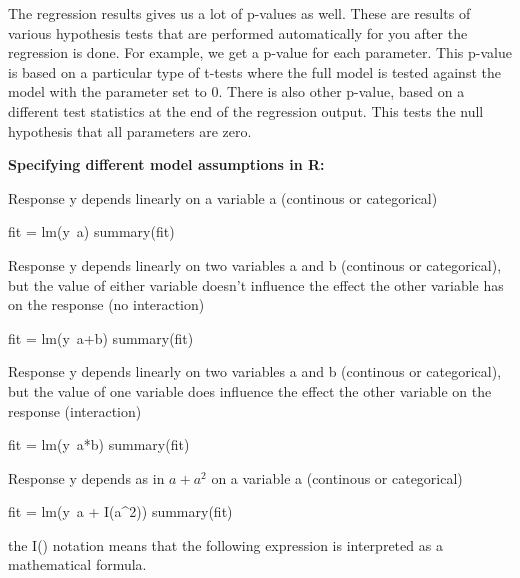 \documentclass[a4paper,twoside]{tufte-book}\usepackage[]{graphicx}\usepackage[]{color}
\begin{document}
The regression results gives us a lot of p-values as well. These are results of various hypothesis tests that are performed automatically for you after the regression is done. For example, we get a p-value for each parameter. This p-value is based on a particular type of t-tests where the full model is tested against the model with the parameter set to 0. There is also other p-value, based on a different test statistics at the end of the regression output. This tests the null hypothesis that all parameters are zero.  


\vspace{1cm}
\begin{fullwidth}
\begin{mdframed}
    
\textbf{Specifying different model assumptions in R:} 

Response y depends linearly on a variable a (continous or categorical)

\begin{Schunk}
\begin{Sinput}
fit = lm(y~a)
summary(fit)
\end{Sinput}
\end{Schunk}

Response y depends linearly on two variables a and b (continous or categorical), but the value of either variable doesn't influence the effect the other variable has on the response (no interaction)

\begin{Schunk}
\begin{Sinput}
fit = lm(y~a+b)
summary(fit)
\end{Sinput}
\end{Schunk}

Response y depends linearly on two variables a and b (continous or categorical), but the value of one variable does influence the effect the other variable on the response (interaction)

\begin{Schunk}
\begin{Sinput}
fit = lm(y~a*b)
summary(fit)
\end{Sinput}
\end{Schunk}

Response y depends as in $a + a^2$ on a variable a (continous or categorical)

\begin{Schunk}
\begin{Sinput}
fit = lm(y~a + I(a^2))
summary(fit)
\end{Sinput}
\end{Schunk}

the I() notation means that the following expression is interpreted as a mathematical formula. 

\end{mdframed}
\end{fullwidth}
\end{document}
